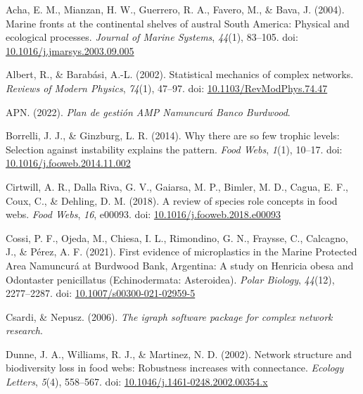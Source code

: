 \documentclass[preprint, 3p,
authoryear]{elsarticle} %
\newlength{\cslhangindent}
\newlength{\cslentryspacingunit} %
\newenvironment{CSLReferences}[2] %
 {%
  \setlength{\parindent}{0pt}
  \ifodd #1
  \let\oldpar\par
  \def\par{\hangindent=\cslhangindent\oldpar}
  \fi
  \setlength{\parskip}{#2\cslentryspacingunit}
 }%
 {}
\begin{document}
\hypertarget{refs}{}
\begin{CSLReferences}{1}{0}
\leavevmode{}%
Acha, E. M., Mianzan, H. W., Guerrero, R. A., Favero, M., \& Bava, J.
(2004). Marine fronts at the continental shelves of austral {South
America}: {Physical} and ecological processes. \emph{Journal of Marine
Systems}, \emph{44}(1), 83--105. doi:
\href{https://doi.org/10.1016/j.jmarsys.2003.09.005}{10.1016/j.jmarsys.2003.09.005}

\leavevmode{}%
Albert, R., \& Barabási, A.-L. (2002). Statistical mechanics of complex
networks. \emph{Reviews of Modern Physics}, \emph{74}(1), 47--97. doi:
\href{https://doi.org/10.1103/RevModPhys.74.47}{10.1103/RevModPhys.74.47}

\leavevmode{}%
APN. (2022). \emph{Plan de gestión {AMP Namuncurá Banco Burdwood}}.

\leavevmode{}%
Borrelli, J. J., \& Ginzburg, L. R. (2014). Why there are so few trophic
levels: {Selection} against instability explains the pattern. \emph{Food
Webs}, \emph{1}(1), 10--17. doi:
\href{https://doi.org/10.1016/j.fooweb.2014.11.002}{10.1016/j.fooweb.2014.11.002}

\leavevmode{}%
Cirtwill, A. R., Dalla Riva, G. V., Gaiarsa, M. P., Bimler, M. D.,
Cagua, E. F., Coux, C., \& Dehling, D. M. (2018). A review of species
role concepts in food webs. \emph{Food Webs}, \emph{16}, e00093. doi:
\href{https://doi.org/10.1016/j.fooweb.2018.e00093}{10.1016/j.fooweb.2018.e00093}

\leavevmode{}%
Cossi, P. F., Ojeda, M., Chiesa, I. L., Rimondino, G. N., Fraysse, C.,
Calcagno, J., \& Pérez, A. F. (2021). First evidence of microplastics in
the {Marine Protected Area Namuncurá} at {Burdwood Bank}, {Argentina}: A
study on {Henricia} obesa and {Odontaster} penicillatus
({Echinodermata}: {Asteroidea}). \emph{Polar Biology}, \emph{44}(12),
2277--2287. doi:
\href{https://doi.org/10.1007/s00300-021-02959-5}{10.1007/s00300-021-02959-5}

\leavevmode{}%
Csardi, \& Nepusz. (2006). \emph{The igraph software package for complex
network research}.

\leavevmode{}%
Dunne, J. A., Williams, R. J., \& Martinez, N. D. (2002). Network
structure and biodiversity loss in food webs: Robustness increases with
connectance. \emph{Ecology Letters}, \emph{5}(4), 558--567. doi:
\href{https://doi.org/10.1046/j.1461-0248.2002.00354.x}{10.1046/j.1461-0248.2002.00354.x}


\end{CSLReferences}
\end{document}
